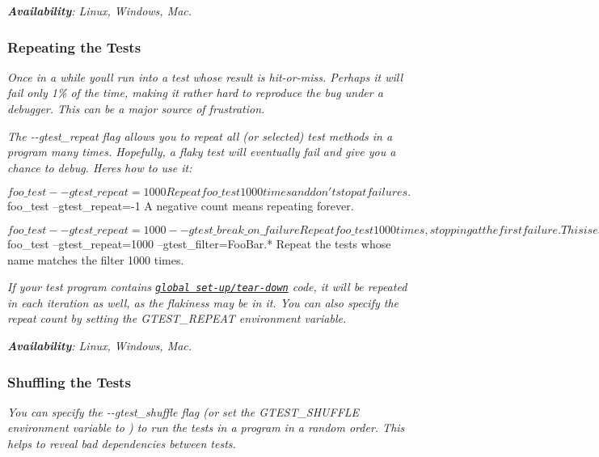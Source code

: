 {\itshape {\bfseries Availability}\+: Linux, Windows, Mac.}

{\itshape \subsubsection*{Repeating the Tests}}

{\itshape }

{\itshape Once in a while you\textquotesingle{}ll run into a test whose result is hit-\/or-\/miss. Perhaps it will fail only 1\% of the time, making it rather hard to reproduce the bug under a debugger. This can be a major source of frustration.}

{\itshape The {\ttfamily -\/-\/gtest\+\_\+repeat} flag allows you to repeat all (or selected) test methods in a program many times. Hopefully, a flaky test will eventually fail and give you a chance to debug. Here\textquotesingle{}s how to use it\+:}

{\itshape 
\begin{DoxyCode}
$ foo\_test --gtest\_repeat=1000
Repeat foo\_test 1000 times and don't stop at failures.

$ foo\_test --gtest\_repeat=-1
A negative count means repeating forever.

$ foo\_test --gtest\_repeat=1000 --gtest\_break\_on\_failure
Repeat foo\_test 1000 times, stopping at the first failure.  This
is especially useful when running under a debugger: when the test
fails, it will drop into the debugger and you can then inspect
variables and stacks.

$ foo\_test --gtest\_repeat=1000 --gtest\_filter=FooBar.*
Repeat the tests whose name matches the filter 1000 times.
\end{DoxyCode}
}

{\itshape If your test program contains \href{#global-set-up-and-tear-down}{\tt global set-\/up/tear-\/down} code, it will be repeated in each iteration as well, as the flakiness may be in it. You can also specify the repeat count by setting the {\ttfamily G\+T\+E\+S\+T\+\_\+\+R\+E\+P\+E\+AT} environment variable.}

{\itshape {\bfseries Availability}\+: Linux, Windows, Mac.}

{\itshape \subsubsection*{Shuffling the Tests}}

{\itshape }

{\itshape You can specify the {\ttfamily -\/-\/gtest\+\_\+shuffle} flag (or set the {\ttfamily G\+T\+E\+S\+T\+\_\+\+S\+H\+U\+F\+F\+LE} environment variable to {}) to run the tests in a program in a random order. This helps to reveal bad dependencies between tests.}

